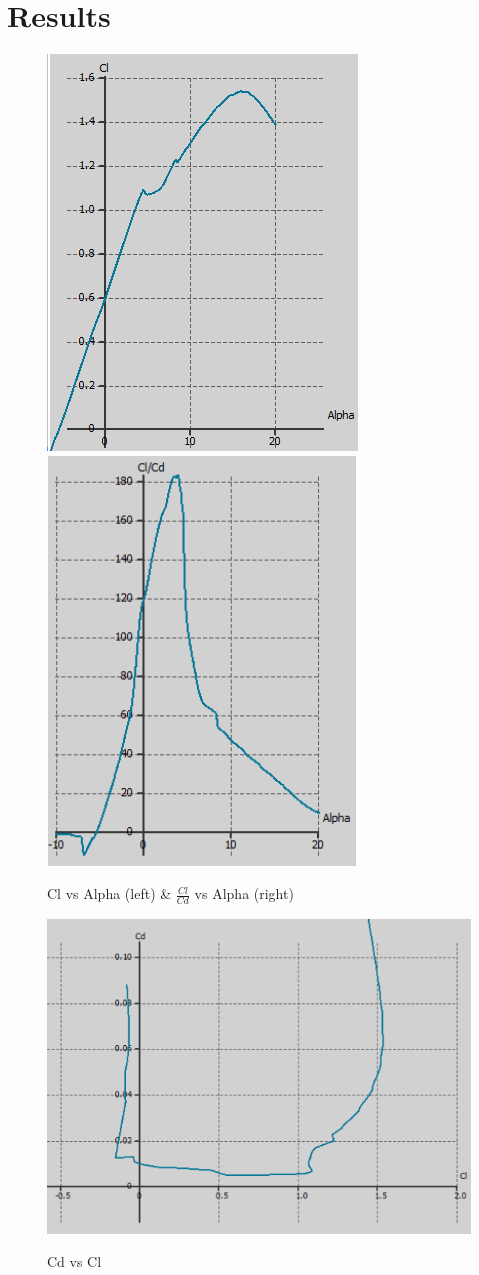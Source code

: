 \documentclass[12pt,A4paper]{article}
\begin{document}
	\section{Results}
	\begin{figure}[!h]
		\centering
		\includegraphics[width=.39\textwidth]{ClAlpha.png}\hspace{0.02 in} \label{fig:f2}
		\includegraphics[width=.375\textwidth]{ClCdAlpha.png} \label{fig:f3}
		\caption{Cl vs Alpha (left) \& $\frac{Cl}{Cd}$ vs Alpha (right)}
	\end{figure}
	\begin{figure}[!h]
		\centering
		\includegraphics[width=.6\textwidth]{CdCl.png} \label{fig:f4}
		\caption{Cd vs Cl}
	\end{figure}
\end{document}
